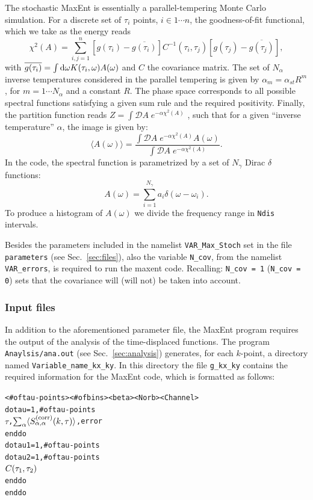 The stochastic MaxEnt is essentially a parallel-tempering Monte Carlo simulation.  For a discrete set of $\tau_i$ points,  $i \in 1 \cdots n $, the goodness-of-fit functional, which we take as the energy reads
\begin{equation}
  \chi^{2}(A) =  \sum_{i,j=1}^{n}   \left[ g(\tau_i)  -  \overline{g(\tau_i)} \right] C^{-1}(\tau_i,\tau_j) \left[    g(\tau_j)  -  \overline{g(\tau_j)} \right] ,
\end{equation}
with $ \overline{g(\tau_i)} =\int \mathrm{d}{\omega} K(\tau_{i},\omega)  A(\omega)$ and  $C$ the covariance matrix. 
The set of $N_{\alpha}$ inverse temperatures considered in the parallel tempering is given by
$ \alpha_m = \alpha_{st}  R^{m}$, for $m = 1 \cdots N_{\alpha} $ and a constant $R$. The phase space corresponds to all possible spectral functions satisfying a given sum rule and the required positivity.  Finally, the partition function reads
$Z =  \int\mathcal{D}\!A\; e^{-\alpha \chi^{2}(A)}$ \cite{Beach04a}, such that for a given ``inverse temperature'' $\alpha$, the image is given by: 
\begin{equation}
  \langle A ( \omega) \rangle  =   \frac{\int\mathcal{D}\!A\; e^{-\alpha \chi^{2}(A)}  A(\omega) }{ \int\mathcal{D}\!A\; e^{-\alpha \chi^{2}(A)}  }.
\end{equation}
In the code, the spectral function is parametrized  by a  set of $N_{\gamma}$ Dirac $\delta$ functions: 
\begin{equation}
      A(\omega)  = \sum_{i=1}^{N_{\gamma}} a_{i} \delta \left( \omega - \omega_i \right).
\end{equation}
To produce a histogram of  $ A(\omega) $ we divide  the frequency range in \texttt{Ndis} intervals. 

Besides the parameters included in the namelist \texttt{VAR\_Max\_Stoch} set in the file \texttt{parameters} (see Sec.~\ref{sec:files}), also the variable \texttt{N\_cov}, from the namelist \texttt{VAR\_errors}, is required to run the maxent code. Recalling: \texttt{N\_cov = 1} (\texttt{N\_cov = 0}) sets that the covariance will (will not) be taken into account.

\subsubsection*{Input files} 
In addition to the aforementioned parameter file, the MaxEnt program requires the output of the  analysis of the time-displaced functions. The program \texttt{Anaylsis/ana.out} (see Sec.~\ref{sec:analysis}) generates, for each $k$-point, a directory named   \texttt{Variable\_name\_kx\_ky}.  In this directory  the file \texttt{g\_kx\_ky} contains the  required information for the MaxEnt code, which is formatted as follows:
\begin{alltt}
<# of tau-points>  <# of bins >  <beta>  <Norb>  <Channel>
do tau = 1, # of tau-points
   \( \tau\),  \( \sum\sb{\alpha}\langle{S}\sb{\alpha,\alpha}\sp{(\mathrm{corr})}(k,\tau)\rangle\),   error
enddo
do tau1 = 1, # of tau-points
  do tau2 = 1, # of tau-points
     \( C(\tau\sb{1},\tau\sb{2}) \)
  enddo
enddo
\end{alltt}

